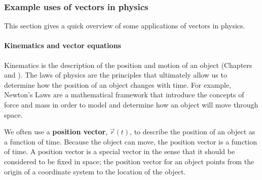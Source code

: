 \subsubsection{Example uses of vectors in physics}

This section gives a quick overview of some applications of vectors in physics.

\paragraph{Kinematics and vector equations}

Kinematics is the description of the position and motion of an object (Chapters \href{\#chapter:describingmotionin1d}{} and \href{\#chapter:describingmotioninnd}{}). The laws of physics are the principles that ultimately allow us to determine how the position of an object changes with time. For example, Newton's Laws are a mathematical framework that introduce the concepts of force and mass in order to model and determine how an object will move through space.

We often use a \textbf{position vector}, $\vec r(t)$, to describe the position of an object as a function of time. Because the object can move, the position vector is a function of time. A position vector is a special vector in the sense that it should be considered to be fixed in space; the position vector for an object points from the origin of a coordinate system to the location of the object.

